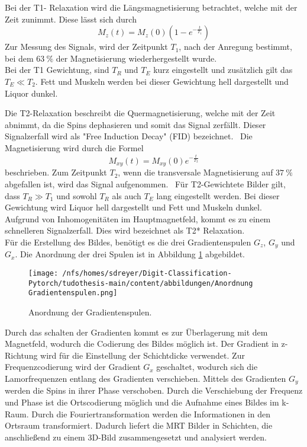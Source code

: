 Bei der T1- Relaxation wird die Längsmagnetisierung betrachtet, welche mit der Zeit zunimmt.
Diese lässt sich durch 
\begin{equation}
    M_z(t) = M_z(0) (1 - e^{-\frac{t}{T_1}})
\end{equation}
Zur Messung des Signals, wird der Zeitpunkt $T_1$, nach der Anregung bestimmt, bei dem $\qty{63}{\%}$ der Magnetisierung wiederhergestellt wurde.~\cite{Pollmann}\\
Bei der T1 Gewichtung, sind $T_R$ und $T_E$ kurz eingestellt und zusätzlich gilt das $T_E \ll T_2$.
Fett und Muskeln werden bei dieser Gewichtung hell dargestellt und Liquor dunkel.~\cite{Schlegel}

Die T2-Relaxation beschreibt die Quermagnetisierung, welche mit der Zeit abnimmt, da die Spins dephasieren und somit das Signal zerfällt.
Dieser Signalzerfall wird als "Free Induction Decay" (FID) bezeichnet.~\cite{Dössel}
Die Magnetisierung wird durch die Formel
\begin{equation}
    M_{xy}(t) = M_{xy}(0) e^{-\frac{t}{T_2}} 
\end{equation}
beschrieben.
Zum Zeitpunkt $T_2$, wenn die transversale Magnetisierung auf $\qty{37}{\%}$ abgefallen ist, wird das Signal aufgenommen.~\cite{Pollmann}
Für T2-Gewichtete Bilder gilt, dass $T_R \gg T_1$ und sowohl $T_R$ als auch $T_E$  lang eingestellt werden. 
Bei dieser Gewichtung wird Liquor hell dargestellt und Fett und Muskeln dunkel.~\cite{Schlegel} 
Aufgrund von Inhomogenitäten im Hauptmagnetfeld, kommt es zu einem schnelleren Signalzerfall. Dies wird bezeichnet als T2* Relaxation.~\cite{Dössel}\\


Für die Erstellung des Bildes, benötigt es die drei Gradientenspulen $G_z$, $G_y$ und $G_x$. Die Anordnung der drei Spulen 
ist in Abbildung \ref{fig:an Grad} abgebildet.
\begin{figure}[htbp]
  \centering
  \texttt{[image: /nfs/homes/sdreyer/Digit-Classification-Pytorch/tudothesis-main/content/abbildungen/Anordnung Gradientenspulen.png]}
  \caption{Anordnung der Gradientenspulen.\cite{Schlegel}}
  \label{fig:an Grad}
\end{figure}
Durch das schalten der Gradienten kommt es zur Überlagerung mit dem Magnetfeld, wodurch die Codierung des Bildes möglich ist.
Der Gradient in z-Richtung wird für die Einstellung der Schichtdicke verwendet. 
Zur Frequenzcodierung wird der Gradient $G_x$ geschaltet, wodurch sich die Lamorfrequenzen entlang des Gradienten verschieben.
Mittels des Gradienten $G_y$ werden die Spins in ihrer Phase verschoben.
Durch die Verschiebung der Frequenz und Phase ist die Ortscodierung möglich und die Aufnahme eines Bildes im k-Raum.
Durch die Fouriertransformation werden die Informationen in den Ortsraum transformiert.
Dadurch liefert die MRT Bilder in Schichten, die anschließend zu einem 3D-Bild zusammengesetzt und analysiert werden.~\cite{pabst2013}


